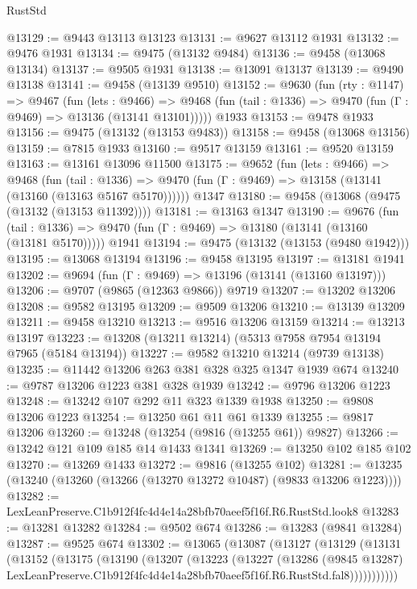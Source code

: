 \begin{lexlean}{RustStd}
\begin{coremodule}
@13129 := @9443 @13113 @13123
@13131 := @9627 @13112 @1931
@13132 := @9476 @1931
@13134 := @9475 (@13132 @9484)
@13136 := @9458 (@13068 @13134)
@13137 := @9505 @1931
@13138 := @13091 @13137
@13139 := @9490 @13138
@13141 := @9458 (@13139 @9510)
@13152 := @9630
    (fun (rty : @1147) =>
    @9467
      (fun (lets : @9466) =>
      @9468 (fun (tail : @1336) => @9470 (fun (Γ : @9469) => @13136 (@13141 @13101)))))
    @1933
@13153 := @9478 @1933
@13156 := @9475 (@13132 (@13153 @9483))
@13158 := @9458 (@13068 @13156)
@13159 := @7815 @1933
@13160 := @9517 @13159
@13161 := @9520 @13159
@13163 := @13161 @13096 @11500
@13175 := @9652
    (fun (lets : @9466) =>
    @9468
      (fun (tail : @1336) =>
      @9470 (fun (Γ : @9469) => @13158 (@13141 (@13160 (@13163 @5167 @5170))))))
    @1347
@13180 := @9458 (@13068 (@9475 (@13132 (@13153 @11392))))
@13181 := @13163 @1347
@13190 := @9676
    (fun (tail : @1336) => @9470 (fun (Γ : @9469) => @13180 (@13141 (@13160 (@13181 @5170)))))
    @1941
@13194 := @9475 (@13132 (@13153 (@9480 @1942)))
@13195 := @13068 @13194
@13196 := @9458 @13195
@13197 := @13181 @1941
@13202 := @9694 (fun (Γ : @9469) => @13196 (@13141 (@13160 @13197)))
@13206 := @9707 (@9865 (@12363 @9866)) @9719
@13207 := @13202 @13206
@13208 := @9582 @13195
@13209 := @9509 @13206
@13210 := @13139 @13209
@13211 := @9458 @13210
@13213 := @9516 @13206 @13159
@13214 := @13213 @13197
@13223 := @13208 (@13211 @13214) (@5313 @7958 @7954 @13194 @7965 (@5184 @13194))
@13227 := @9582 @13210 @13214 (@9739 @13138)
@13235 := @11442 @13206 @263 @381 @328 @325 @1347 @1939 @674
@13240 := @9787 @13206 @1223 @381 @328 @1939
@13242 := @9796 @13206 @1223
@13248 := @13242 @107 @292 @11 @323 @1339 @1938
@13250 := @9808 @13206 @1223
@13254 := @13250 @61 @11 @61 @1339
@13255 := @9817 @13206
@13260 := @13248 (@13254 (@9816 (@13255 @61)) @9827)
@13266 := @13242 @121 @109 @185 @14 @1433 @1341
@13269 := @13250 @102 @185 @102
@13270 := @13269 @1433
@13272 := @9816 (@13255 @102)
@13281 := @13235 (@13240 (@13260 (@13266 (@13270 @13272 @10487) (@9833 @13206 @1223))))
@13282 := LexLeanPreserve.C1b912f4fc4d4e14a28bfb70aeef5f16f.R6.RustStd.look8
@13283 := @13281 @13282
@13284 := @9502 @674
@13286 := @13283 (@9841 @13284)
@13287 := @9525 @674
@13302 := @13065
    (@13087
      (@13127
        (@13129
          (@13131
            (@13152
              (@13175
                (@13190
                  (@13207
                    (@13223
                      (@13227
                        (@13286
                          (@9845 @13287)
                          LexLeanPreserve.C1b912f4fc4d4e14a28bfb70aeef5f16f.R6.RustStd.fal8)))))))))))

\end{coremodule}
\end{lexlean}
